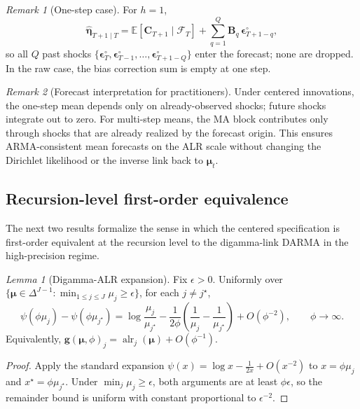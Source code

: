 \documentclass[12pt]{article}
\newcommand{\calF}{\mathcal{F}}
\theoremstyle{remark}
\newtheorem*{remark}{Remark}
\newtheorem{lemma}{Lemma}
\newcommand{\E}{\mathbb{E}}
\newcommand{\alr}{\operatorname{alr}}
\newcommand{\bfmu}{\boldsymbol{\mu}}
\newcommand{\bfeta}{\boldsymbol{\eta}}
\newcommand{\bfB}{\mathbf{B}}
\newcommand{\bfC}{\mathbf{C}}
\begin{document}
\begin{remark}[One-step case]
For $h=1$,
\[
\widehat{\bfeta}_{T+1\mid T}
= \E[\bfC_{T+1}\mid \calF_T]
+ \sum_{q=1}^{Q} \bfB_q\,\boldsymbol{\epsilon}_{T+1-q}^{\circ},
\]
so all $Q$ past shocks $\{\boldsymbol{\epsilon}_T^{\circ},\boldsymbol{\epsilon}_{T-1}^{\circ},\dots,\boldsymbol{\epsilon}_{T+1-Q}^{\circ}\}$
enter the forecast; none are dropped. In the raw case, the bias correction sum is empty at one step.
\end{remark}

\begin{remark}[Forecast interpretation for practitioners]
Under centered innovations, the one-step mean depends only on already-observed shocks; future shocks integrate out to zero. For multi-step means, the MA block contributes only through shocks that are already realized by the forecast origin. This ensures ARMA-consistent mean forecasts on the ALR scale without changing the Dirichlet likelihood or the inverse link back to $\bfmu_t$.
\end{remark}

\subsection{Recursion-level first-order equivalence}\label{sec:equiv}

The next two results formalize the sense in which the centered specification is first-order equivalent at the recursion level to the digamma-link DARMA in the high-precision regime.

\begin{lemma}[Digamma-ALR expansion]
\label{lem:expansion}
Fix $\epsilon>0$. Uniformly over $\{\bfmu\in\Delta^{J-1}:\min_{1\le j\le J}\mu_j\ge\epsilon\}$, for each $j\neq j^\star$,
\[
\psi(\phi\mu_j)-\psi(\phi\mu_{j^\star})
= \log\frac{\mu_j}{\mu_{j^\star}}
-\frac{1}{2\phi}\!\left(\frac{1}{\mu_j}-\frac{1}{\mu_{j^\star}}\right)
+ O(\phi^{-2}),\qquad \phi\to\infty.
\]
Equivalently, $\mathbf{g}(\bfmu,\phi)_j=\alr_j(\bfmu)+O(\phi^{-1})$.
\end{lemma}

\begin{proof}
Apply the standard expansion $\psi(x)=\log x-\tfrac{1}{2x}+O(x^{-2})$ to $x=\phi\mu_j$ and $x^\star=\phi\mu_{j^\star}$. Under $\min_j \mu_j\ge\epsilon$, both arguments are at least $\phi\epsilon$, so the remainder bound is uniform with constant proportional to $\epsilon^{-2}$.
\end{proof}
\end{document}
